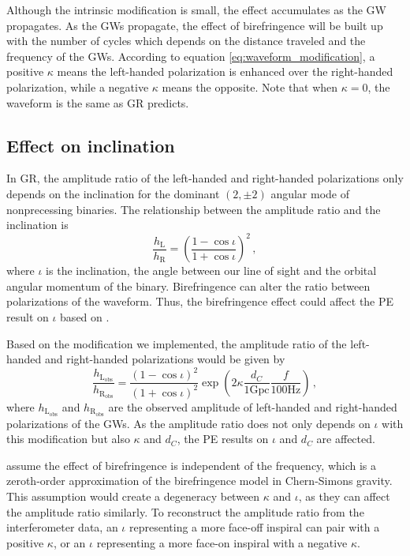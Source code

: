 \documentclass[aps,prd,twocolumn,superscriptaddress,preprintnumbers,floatfix,nofootinbib]{revtex4-2}
\begin{document}
Although the intrinsic modification is small, the effect accumulates as the GW propagates.
As the GWs propagate, the effect of birefringence will be built up with the number of cycles which depends on the distance traveled and the frequency of the GWs.
According to equation \ref{eq:waveform_modification}, a positive $\kappa$ means the left-handed polarization is enhanced over the right-handed polarization, while a negative $\kappa$ means the opposite.
Note that when $\kappa=0$, the waveform is the same as GR predicts.

\subsection{Effect on inclination}
In GR, the amplitude ratio of the left-handed and right-handed polarizations only depends on the inclination for the dominant $(2,\pm 2)$ angular mode of nonprecessing binaries.
The relationship between the amplitude ratio and the inclination is
\begin{equation}
    \frac{h_\mathrm{L}}{h_\mathrm{R}}=\left(\frac{1-\cos\iota}{1+\cos\iota}\right)^2\,,
\end{equation}
where $\iota$ is the inclination, the angle between our line of sight and the orbital angular momentum of the binary.
Birefringence can alter the ratio between polarizations of the waveform.
Thus, the birefringence effect could affect the PE result on $\iota$ based on \citet{Okounkova_2022}.

Based on the modification we implemented, the amplitude ratio of the left-handed and right-handed polarizations would be given by
\begin{equation}
    \frac{h_\mathrm{L_{obs}}}{h_\mathrm{R_{obs}}}=\frac{\left(1-\cos\iota\right)^2}{\left(1+\cos\iota\right)^2}\exp\left({2\kappa\frac{d_C}{1\mathrm{Gpc}}\frac{f}{100\mathrm{Hz}}}\right)\,,
    \label{eq:modified_amplitude_ratio}
\end{equation}
where $h_\mathrm{L_{obs}}$ and $h_\mathrm{R_{obs}}$ are the observed amplitude of left-handed and right-handed polarizations of the GWs.
As the amplitude ratio does not only depends on $\iota$ with this modification but also $\kappa$ and $d_C$, the PE results on $\iota$ and $d_C$ are affected.

\citet{Okounkova_2022} assume the effect of birefringence is independent of the frequency, which is a zeroth-order approximation of the birefringence model in Chern-Simons gravity.
This assumption would create a degeneracy between $\kappa$ and $\iota$, as they can affect the amplitude ratio similarly.
To reconstruct the amplitude ratio from the interferometer data, an $\iota$ representing a more face-off inspiral can pair with a positive $\kappa$, or an $\iota$ representing a more face-on inspiral with a negative $\kappa$.
\end{document}
